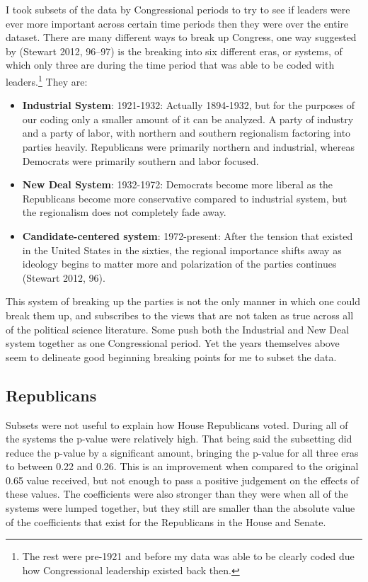 \documentclass[12pt,twoside]{reedthesis}
\begin{document}
  I took subsets of the data by Congressional periods to try to see if
  leaders were ever more important across certain time periods then they
  were over the entire dataset. There are many different ways to break up
  Congress, one way suggested by (Stewart 2012, 96--97) is the breaking
  into six different eras, or systems, of which only three are during the
  time period that was able to be coded with
  leaders.\footnote{The rest were pre-1921 and before my data was able to be clearly coded due how Congressional leadership existed back then.}
  They are:
  
  \begin{itemize}
  \itemsep1pt\parskip0pt
  \item
    \textbf{Industrial System}: 1921-1932: Actually 1894-1932, but for the
    purposes of our coding only a smaller amount of it can be analyzed. A
    party of industry and a party of labor, with northern and southern
    regionalism factoring into parties heavily. Republicans were primarily
    northern and industrial, whereas Democrats were primarily southern and
    labor focused.
  \item
    \textbf{New Deal System}: 1932-1972: Democrats become more liberal as
    the Republicans become more conservative compared to industrial
    system, but the regionalism does not completely fade away.
  \item
    \textbf{Candidate-centered system}: 1972-present: After the tension
    that existed in the United States in the sixties, the regional
    importance shifts away as ideology begins to matter more and
    polarization of the parties continues (Stewart 2012, 96).
  \end{itemize}
  
  This system of breaking up the parties is not the only manner in which
  one could break them up, and subscribes to the views that are not taken
  as true across all of the political science literature. Some push both
  the Industrial and New Deal system together as one Congressional period.
  Yet the years themselves above seem to delineate good beginning breaking
  points for me to subset the data.
  
  \subsection{Republicans}\label{republicans-1}
  
  Subsets were not useful to explain how House Republicans voted. During
  all of the systems the p-value were relatively high. That being said the
  subsetting did reduce the p-value by a significant amount, bringing the
  p-value for all three eras to between 0.22 and 0.26. This is an
  improvement when compared to the original 0.65 value received, but not
  enough to pass a positive judgement on the effects of these values. The
  coefficients were also stronger than they were when all of the systems
  were lumped together, but they still are smaller than the absolute value
  of the coefficients that exist for the Republicans in the House and
  Senate.
  
\end{document}
